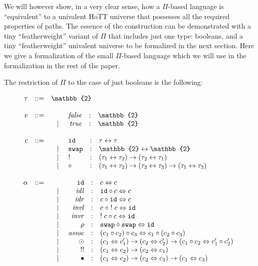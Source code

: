 \documentclass{entcs}
\newcommand{\swap}{\texttt{swap}}
\newcommand{\id}{\texttt{id}}
\newcommand{\compc}[2]{#1 \circ #2}
\newcommand{\alt}{~\mid~}
\newcommand{\invc}[1]{!\;#1}
\newcommand{\assocc}{\mathit{assoc}}
\newcommand{\invl}{\mathit{invl}}
\newcommand{\invr}{\mathit{invr}}
\newcommand{\idlc}{\mathit{idl}}
\newcommand{\idrc}{\mathit{idr}}
\newcommand{\iso}{\leftrightarrow}
\newcommand{\isotwo}{\Leftrightarrow}
\newcommand{\bt}{\mathbb{2}}
\newcommand{\fc}{\mathit{false}}
\newcommand{\tc}{\mathit{true}}
\begin{document}
We will however show, in a very clear sense, how a $\Pi$-based language is
``equivalent'' to a univalent HoTT universe that possesses all the required
properties of paths. The essence of the construction can be demonstrated with a
tiny ``featherweight'' variant of $\Pi$ that includes just one type: booleans,
and a tiny ``featherweight'' univalent universe to be formalized in the next
section. Here we give a formalization of the small $\Pi$-based language which we
will use in the formalization in the rest of the paper.

The restriction of $\Pi$ to the case of just booleans is the following:

\[\begin{array}{rcl}
\tau &::=& \bt \\
\\
v &::=& \begin{array}[t]{lrcl}
                    & \fc &:& \bt \\
              \alt & \tc &:& \bt
               \end{array} \\
\\
c &::=& \begin{array}[t]{llcl}
              & \id &:& \tau \iso \tau \\
               \alt & \swap &:& \bt \iso \bt \\
               \alt & ! &:& (\tau_1 \iso \tau_2) \to (\tau_2 \iso \tau_1) \\
               \alt & \circ &:& (\tau_1 \iso \tau_2) \to (\tau_2 \iso \tau_3) \to (\tau_1 \iso \tau_3)
               \end{array} \\
\\
\alpha &::=& \begin{array}[t]{lrcl}
               & \id &:& c \isotwo c \\
            \alt & \idlc &:& \compc{\id}{c} \isotwo c \\
            \alt & \idrc &:& \compc{c}{\id} \isotwo c \\
            \alt & \invl &:& \compc{c\;}{\;\invc{c}} \isotwo \id \\
            \alt & \invr &:& \compc{\invc{c}}{c} \isotwo \id \\
            \alt & \rho &:& \swap \circ \swap \isotwo \id \\
            \alt & \assocc &:& \compc{(\compc{c_1}{c_2})}{c_3} \isotwo \compc{c_1}{(\compc{c_2}{c_3})} \\
            \alt & \odot &:& (c_1 \isotwo c_1') \to (c_2 \isotwo c_2') \to (\compc{c_1}{c_2} \isotwo \compc{c_1'}{c_2'}) \\
            \alt & !! &:& (c_1 \isotwo c_2) \to (c_2 \isotwo c_1) \\
            \alt & \bullet &:& (c_1 \isotwo c_2) \to (c_2 \isotwo c_3) \to (c_1 \isotwo c_3)
             \end{array}
\end{array}\]
\end{document}
